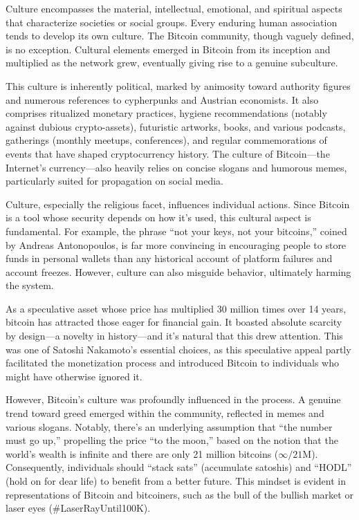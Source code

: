 \documentclass[
  a5paper,
  smalldemyvopaper,10pt,twoside,onecolumn,openright,extrafontsizes,hidelinks]{memoir}
\begin{document}
Culture encompasses the material, intellectual, emotional, and spiritual
aspects that characterize societies or social groups. Every enduring
human association tends to develop its own culture. The Bitcoin
community, though vaguely defined, is no exception. Cultural elements
emerged in Bitcoin from its inception and multiplied as the network
grew, eventually giving rise to a genuine subculture.

This culture is inherently political, marked by animosity toward
authority figures and numerous references to cypherpunks and Austrian
economists. It also comprises ritualized monetary practices, hygiene
recommendations (notably against dubious crypto-assets), futuristic
artworks, books, and various podcasts, gatherings (monthly meetups,
conferences), and regular commemorations of events that have shaped
cryptocurrency history. The culture of Bitcoin---the Internet's
currency---also heavily relies on concise slogans and humorous memes,
particularly suited for propagation on social media.

Culture, especially the religious facet, influences individual actions.
Since Bitcoin is a tool whose security depends on how it's used, this
cultural aspect is fundamental. For example, the phrase ``not your keys,
not your bitcoins,'' coined by Andreas Antonopoulos, is far more
convincing in encouraging people to store funds in personal wallets than
any historical account of platform failures and account freezes.
However, culture can also misguide behavior, ultimately harming the
system.

As a speculative asset whose price has multiplied 30 million times over
14 years, bitcoin has attracted those eager for financial gain. It
boasted absolute scarcity by design---a novelty in history---and it's
natural that this drew attention. This was one of Satoshi Nakamoto's
essential choices, as this speculative appeal partly facilitated the
monetization process and introduced Bitcoin to individuals who might
have otherwise ignored it.

However, Bitcoin's culture was profoundly influenced in the process. A
genuine trend toward greed emerged within the community, reflected in
memes and various slogans. Notably, there's an underlying assumption
that ``the number must go up,'' propelling the price ``to the moon,''
based on the notion that the world's wealth is infinite and there are
only 21 million bitcoins (\(\infty / 21\mathrm{M}\)). Consequently,
individuals should ``stack sats'' (accumulate satoshis) and ``HODL''
(hold on for dear life) to benefit from a better future. This mindset is
evident in representations of Bitcoin and bitcoiners, such as the bull
of the bullish market or laser eyes (\#LaserRayUntil100K).
\end{document}
